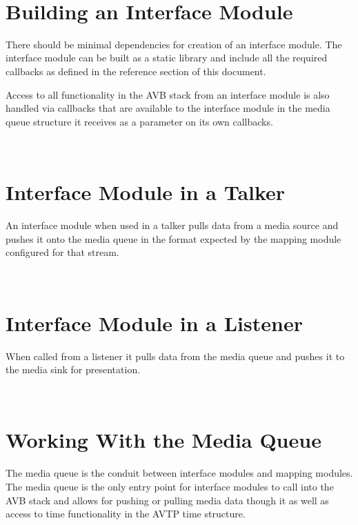 ~\newline
\hypertarget{sdk_avtp_interface_module_dev_sdk_avtp_intf_module_building}{}\section{Building an Interface Module }\label{sdk_avtp_interface_module_dev_sdk_avtp_intf_module_building}
There should be minimal dependencies for creation of an interface module. The interface module can be built as a static library and include all the required callbacks as defined in the reference section of this document.

Access to all functionality in the A\+VB stack from an interface module is also handled via callbacks that are available to the interface module in the media queue structure it receives as a parameter on its own callbacks.

~\newline
\hypertarget{sdk_avtp_interface_module_dev_sdk_avtp_intf_module_talker}{}\section{Interface Module in a Talker }\label{sdk_avtp_interface_module_dev_sdk_avtp_intf_module_talker}
An interface module when used in a talker pulls data from a media source and pushes it onto the media queue in the format expected by the mapping module configured for that stream.

~\newline
\hypertarget{sdk_avtp_interface_module_dev_sdk_avtp_intf_module_listener}{}\section{Interface Module in a Listener }\label{sdk_avtp_interface_module_dev_sdk_avtp_intf_module_listener}
When called from a listener it pulls data from the media queue and pushes it to the media sink for presentation.

~\newline
\hypertarget{sdk_avtp_interface_module_dev_working_with_mediaq}{}\section{Working With the Media Queue }\label{sdk_avtp_interface_module_dev_working_with_mediaq}
The media queue is the conduit between interface modules and mapping modules. The media queue is the only entry point for interface modules to call into the A\+VB stack and allows for pushing or pulling media data though it as well as access to time functionality in the A\+V\+TP time structure.

